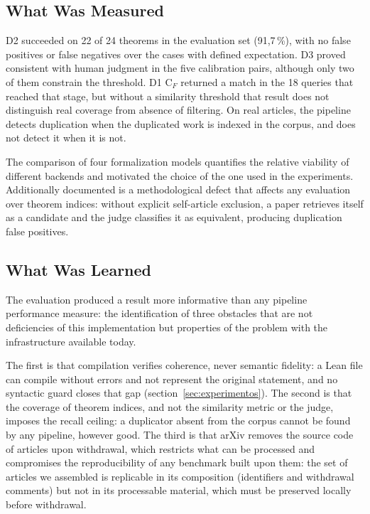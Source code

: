 \documentclass[12pt,a4paper]{article}
\theoremstyle{remark}
\begin{document}
\subsection{What Was Measured}

D2 succeeded on 22 of 24 theorems in the evaluation set (91{,}7\,\%), with no false positives or false negatives over the cases with defined expectation. D3 proved consistent with human judgment in the five calibration pairs, although only two of them constrain the threshold. D1 C$_F$ returned a match in the 18 queries that reached that stage, but without a similarity threshold that result does not distinguish real coverage from absence of filtering. On real articles, the pipeline detects duplication when the duplicated work is indexed in the corpus, and does not detect it when it is not.

The comparison of four formalization models quantifies the relative viability of different backends and motivated the choice of the one used in the experiments. Additionally documented is a methodological defect that affects any evaluation over theorem indices: without explicit self-article exclusion, a paper retrieves itself as a candidate and the judge classifies it as equivalent, producing duplication false positives.

\subsection{What Was Learned}

The evaluation produced a result more informative than any pipeline performance measure: the identification of three obstacles that are not deficiencies of this implementation but properties of the problem with the infrastructure available today.

The first is that compilation verifies coherence, never semantic fidelity: a Lean file can compile without errors and not represent the original statement, and no syntactic guard closes that gap (section~\ref{sec:experimentos}). The second is that the coverage of theorem indices, and not the similarity metric or the judge, imposes the recall ceiling: a duplicator absent from the corpus cannot be found by any pipeline, however good. The third is that arXiv removes the source code of articles upon withdrawal, which restricts what can be processed and compromises the reproducibility of any benchmark built upon them: the set of articles we assembled is replicable in its composition (identifiers and withdrawal comments) but not in its processable material, which must be preserved locally before withdrawal.
\end{document}
